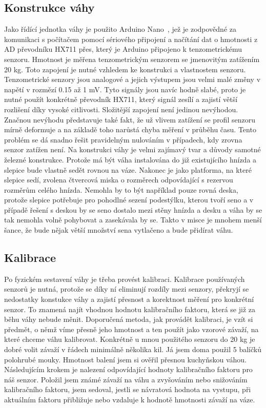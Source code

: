 \subsection*{Konstrukce váhy}
Jako řídící jednotka váhy je použito Arduino Nano~\cite{ArduinoNano}, jež je zodpovědné za komunikaci s počítačem pomocí sériového připojení a načítání dat o hmotnosti z AD převodníku HX711 přes, který je Arduino připojeno k tenzometrickému~\cite{tenzosenzorahx711} senzoru.
Hmotnost je měřena tenzometrickým senzorem se jmenovitým zatížením 20 kg.
Toto zapojení je nutné vzhledem ke konstrukci a vlastnostem senzoru.
Tenzometrické senzory jsou analogové a jejich výstupem jsou velmi malé změny v napětí v rozmězí 0.15 až 1 mV.
Tyto signály jsou navíc hodně slabé, proto je nutné použít konkrétně převodník HX711, který signál zesílí a zajistí větší rozlišení díky vysoké citlivosti.
Složitější zapojení není jedinou nevýhodou.
Značnou nevýhodu představuje také fakt, že už vlivem zatížení se profil senzoru mírně deformuje a na základě toho narůstá chyba měření v průběhu času.
Tento problém se dá snadno řešit pravidelným nulováním v případech, kdy zrovna senzor zatížen není.
Na konstrukci váhy je velmi zajímavý tvar a důvody samotné železné konstrukce.
Protože má být váha instalována do již existujícího hnízda a slepice bude vlastně sedět rovnou na váze.
Nakonec je jako platforma, na které slepice sedí, zvolena čtvercová miska o rozměrech odpovídající s rezervou rozměrům celého hnízda.
Nemohla by to být například pouze rovná deska, protože slepice potřebuje pro pohodlné sezení podestýlku, kterou tvoří seno a v případě řešení s deskou by se seno dostalo mezi stěny hnízda a desku a váha by se tak nemohla volně pohybovat a zasekávala by se.
Takto v misce je mnohem menší šance, že bude nějak větší množství sena vytlačeno a bude přidírat váhu.

\subsection*{Kalibrace}
Po fyzickém sestavení váhy je třeba provést kalibraci.
Kalibrace používaných senzorů je nutná, protože se díky ní eliminují rozdíly mezi senzory, překryjí se nedostatky konstukce váhy a zajistí přesnost a korektnost měření pro konkrétní senzor.
To znamená najít vhodnou hodnotu kalibračního faktoru, která se již za běhu váhy nebude měnit.
Doporučená metoda, jak provádět kalibraci, je vzít si předmět, o němž víme přesně jeho hmotnost a ten použít jako vzorové závaží, na které chceme váhu kalibrovat.
Konkrétně u mnou použitého senzoru do 20 kg je dobré volit závaží v řádech minimálně několika kil.
Já jsem doma použil 5 balíčků polohrubé mouky.
Hmotnost balení jsem si ověřil přesnou kuchyňskou váhou.
Následujícím krokem je nalezení odpovídající hodnoty kalibračního faktoru pro náš senzor.
Položil jsem známé závaží na váhu a zvyšováním nebo snižováním kalibračního faktoru, jsem sedoval, jestli se návratová hodnota na vystupu, při aktuálním faktoru přibližuje nebo vzdaluje k hodnotě hmotnosti závaží na váze.

